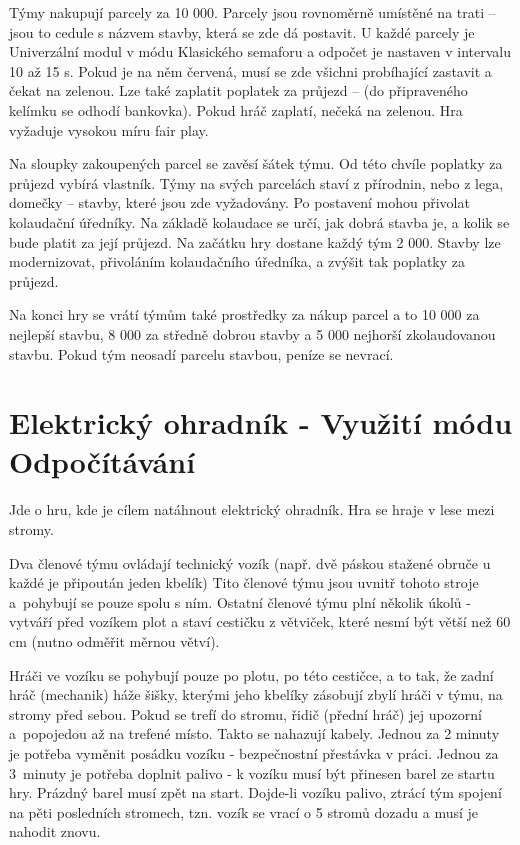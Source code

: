 Týmy nakupují parcely za 10 000. Parcely jsou rovnoměrně umístěné na trati – jsou to cedule s názvem stavby, která se zde dá postavit. U každé parcely je Univerzální modul v módu Klasického semaforu a odpočet je nastaven v intervalu 
10 až 15 s. 
Pokud je na něm červená, musí se zde všichni probíhající zastavit a čekat na zelenou. Lze také zaplatit poplatek za průjezd – (do připraveného kelímku se odhodí bankovka). Pokud hráč zaplatí, nečeká na zelenou. Hra vyžaduje vysokou 
míru fair play. 

Na sloupky zakoupených parcel se zavěsí šátek týmu. Od této chvíle poplatky za průjezd vybírá vlastník. Týmy na svých parcelách staví z přírodnin, nebo z lega, domečky – stavby, které jsou zde vyžadovány. Po postavení mohou přivolat 
kolaudační 
úředníky. Na základě kolaudace se určí, jak dobrá stavba je, a kolik se bude platit za její průjezd. Na začátku hry dostane každý tým 2 000. Stavby lze modernizovat, přivoláním kolaudačního úředníka, a zvýšit tak poplatky za průjezd. 

Na konci hry se vrátí týmům také prostředky za nákup parcel a to 10 000 za nejlepší stavbu, 8 000 za středně dobrou stavby a 5 000 nejhorší zkolaudovanou stavbu. Pokud tým neosadí parcelu stavbou, peníze se nevrací. 


\newpage
\section{Elektrický ohradník - Využití módu Odpočítávání}
Jde o hru, kde je cílem natáhnout elektrický ohradník. Hra se hraje v lese mezi stromy.

Dva členové týmu ovládají technický vozík (např. dvě páskou stažené obruče u každé je připoután jeden kbelík) Tito členové týmu jsou uvnitř tohoto stroje a~pohybují se pouze spolu s ním. Ostatní členové týmu plní několik úkolů - vytváří 
před vozíkem plot a staví cestičku z větviček, které nesmí být větší než 60 cm (nutno odměřit měrnou větví). 

Hráči ve vozíku se pohybují pouze po plotu, po této cestičce, a to tak, že zadní hráč (mechanik) háže šišky, kterými jeho kbelíky zásobují zbylí hráči v týmu, na stromy před sebou. Pokud se trefí do stromu, řidič (přední hráč) jej upozorní 
a~popojedou až na trefené místo. Takto se nahazují kabely. Jednou za 2 minuty je potřeba vyměnit posádku vozíku - bezpečnostní přestávka v práci. Jednou za 3~minuty je potřeba doplnit palivo - k vozíku musí být přinesen barel ze startu 
hry. Prázdný barel musí zpět na start. Dojde-li vozíku palivo, ztrácí tým spojení na pěti posledních stromech, tzn. vozík se vrací o 5 stromů dozadu a musí je nahodit znovu.

